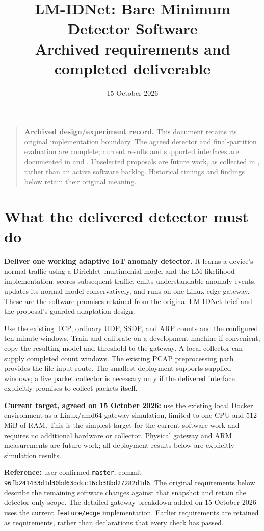 \documentclass[11pt,a4paper]{article}
\title{\textbf{LM-IDNet: Bare Minimum Detector Software}\\[0.4em]
\large Archived requirements and completed deliverable}
\author{}
\date{15 October 2026}
\begin{document}
\maketitle

\begin{quote}
\textbf{Archived design/experiment record.} This document retains its original
implementation boundary. The agreed detector and final-partition evaluation
are complete; current results and supported interfaces are documented in
 and
. Unselected proposals are future
work, as collected in , rather than an active software
backlog. Historical timings and findings below retain their original meaning.
\end{quote}


\section{What the delivered detector must do}

\textbf{Deliver one working adaptive IoT anomaly detector.} It learns a device's
normal traffic using a Dirichlet--multinomial model and the LM likelihood
implementation, scores subsequent traffic, emits understandable anomaly events,
updates its normal model conservatively, and runs on one Linux edge gateway.
These are the software promises retained from the original LM-IDNet brief and
the proposal's guarded-adaptation design.

Use the existing TCP, ordinary UDP, SSDP, and ARP counts and the configured
ten-minute windows. Train and calibrate on a development machine if convenient;
copy the resulting model and threshold to the gateway. A local collector can
supply completed count windows. The existing PCAP preprocessing path provides
the file-input route. The smallest deployment supports supplied windows; a live
packet collector is necessary only if the delivered interface explicitly
promises to collect packets itself.

\textbf{Current target, agreed on 15 October 2026:} use the existing local Docker
environment as a Linux/amd64 gateway simulation, limited to one CPU and 512 MiB
of RAM. This is the simplest target for the current software work and requires
no additional hardware or collector. Physical gateway and ARM measurements are
future work; all deployment results below are explicitly simulation results.

\textbf{Reference:} user-confirmed \texttt{master}, commit
\texttt{96fb241433d1d30bd63ddcc16cb38bd27282d1d6}. The original requirements below
describe the remaining software changes against that snapshot and retain the
detector-only scope. The detailed gateway breakdown added on 15 October 2026
uses the current \texttt{feature/edge} implementation. Earlier requirements are
retained as requirements, rather than declarations that every check has passed.
\end{document}
